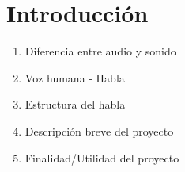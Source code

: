 \documentclass[../main.tex]{subfiles}
\begin{document}
\chapter{Introducción}\label{ch:introduccion}
\begin{enumerate}
    \item Diferencia entre audio y sonido
    \item Voz humana - Habla
    \item Estructura del habla
    \item Descripción breve del proyecto
    \item Finalidad/Utilidad del proyecto
\end{enumerate}
\end{document}
